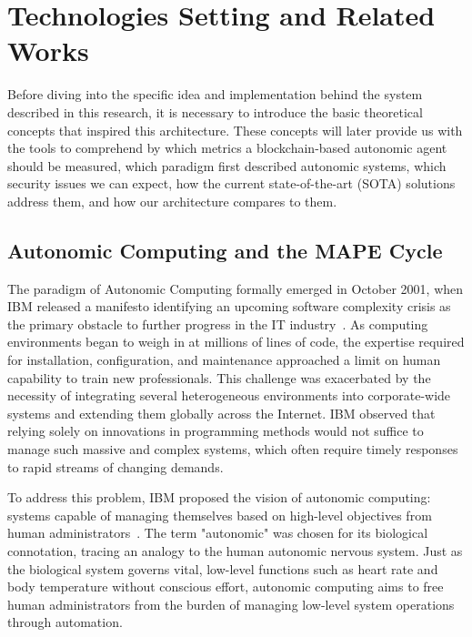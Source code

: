 
\chapter{Technologies Setting and Related Works}
\label{chap:technologies}
Before diving into the specific idea and implementation behind the system described in this research, it is necessary to introduce the basic theoretical concepts that inspired this architecture. These concepts will later provide us with the tools to comprehend by which metrics a blockchain-based autonomic agent should be measured, which paradigm first described autonomic systems, which security issues we can expect, how the current state-of-the-art (SOTA) solutions address them, and how our architecture compares to them.

\section{Autonomic Computing and the MAPE Cycle}
\label{sec:tech_autonomic}
The paradigm of Autonomic Computing formally emerged in October 2001, when IBM released a manifesto identifying an upcoming software complexity crisis as the primary obstacle to further progress in the IT industry~\cite{kephart2003vision}. As computing environments began to weigh in at millions of lines of code, the expertise required for installation, configuration, and maintenance approached a limit on human capability to train new professionals. This challenge was exacerbated by the necessity of integrating several heterogeneous environments into corporate-wide systems and extending them globally across the Internet. IBM observed that relying solely on innovations in programming methods would not suffice to manage such massive and complex systems, which often require timely responses to rapid streams of changing demands.

To address this problem, IBM proposed the vision of autonomic computing: systems capable of managing themselves based on high-level objectives from human administrators~\cite{kephart2003vision}. The term "autonomic" was chosen for its biological connotation, tracing an analogy to the human autonomic nervous system. Just as the biological system governs vital, low-level functions such as heart rate and body temperature without conscious effort, autonomic computing aims to free human administrators from the burden of managing low-level system operations through automation.


